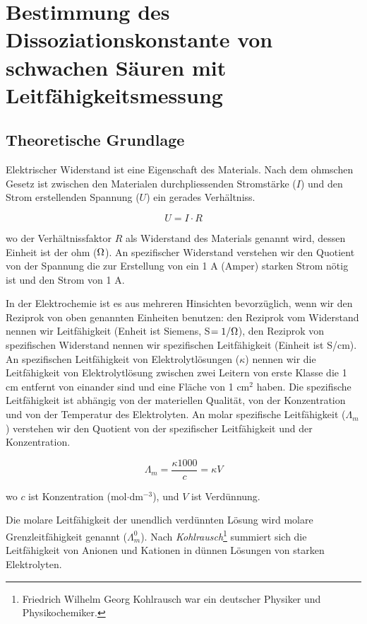 \section{Bestimmung des Dissoziationskonstante von schwachen Säuren mit Leitfähigkeitsmessung}
\subsection{Theoretische Grundlage}

Elektrischer Widerstand ist eine Eigenschaft des Materials. Nach dem ohmschen Gesetz ist zwischen den Materialen durchpliessenden Stromstärke ($I$) und den Strom erstellenden Spannung ($U$) ein gerades Verhältniss.


\begin{equation}
\label{eq:ohm}
	U
	=
	I
	\cdot
	R
\end{equation}

wo der Verhältnissfaktor $R$ als Widerstand des Materials genannt wird, dessen Einheit ist der ohm ($\ohm$).
An spezifischer Widerstand verstehen wir den Quotient von der Spannung die zur Erstellung von ein 1 A (Amper) starken Strom nötig ist und den Strom von 1 A. %

In der Elektrochemie ist es aus mehreren Hinsichten bevorzüglich, wenn wir den Reziprok von oben genannten Einheiten benutzen: den Reziprok vom Widerstand nennen wir Leitfähigkeit (Enheit ist Siemens, S$ = 1 / \ohm$), den Reziprok von spezifischen Widerstand nennen wir spezifischen Leitfähigkeit (Einheit ist S/cm).
An spezifischen Leitfähigkeit von Elektrolytlösungen ($\kappa$) nennen wir die Leitfähigkeit von Elektrolytlösung zwischen zwei Leitern von erste Klasse die 1 cm entfernt von einander sind und eine Fläche von 1 cm$^2$ haben.
Die spezifische Leitfähigkeit ist abhängig von der materiellen Qualität, von der Konzentration und von der Temperatur des Elektrolyten.
An molar spezifische Leitfähigkeit ($\Lambda _m$) verstehen wir den Quotient von der spezifischer Leitfähigkeit und der Konzentration.

\begin{equation}
\label{eq:lambdam}
        \Lambda_m
        =
        \frac
		{\kappa 1000 }
		{c}
	=
	\kappa V
\end{equation}

wo $c$ ist Konzentration (mol$\cdot$dm$^{-3}$), und $V$ ist Verdünnung.

Die molare Leitfähigkeit der unendlich verdünnten Lösung wird molare Grenzleitfähigkeit genannt ($\Lambda _m^0$).
Nach \emph{Kohlrausch}\footnote{Friedrich Wilhelm Georg Kohlrausch war ein deutscher Physiker und Physikochemiker.} summiert sich die Leitfähigkeit von Anionen und Kationen in dünnen Lösungen von starken Elektrolyten. 

